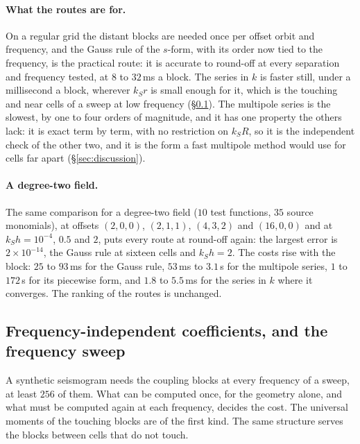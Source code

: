 \documentclass[11pt,a4paper]{article}
\begin{document}
\paragraph{What the routes are for.} On a regular grid the distant blocks are needed once per offset
orbit and frequency, and the Gauss rule of the $s$-form, with its order now tied to the frequency, is the
practical route: it is accurate to round-off at every separation and frequency tested, at $8$ to
$32$\,ms a block. The series in $k$ is faster still, under a millisecond a block, wherever $k_Sr$ is
small enough for it, which is the touching and near cells of a sweep at low frequency
(\S\ref{sec:sweep}). The multipole series is the slowest, by one to four orders of magnitude, and it has
one property the others lack: it is exact term by term, with no restriction on $k_SR$, so it is the
independent check of the other two, and it is the form a fast multipole method would use for cells far
apart (\S\ref{sec:discussion}).

\paragraph{A degree-two field.} The same comparison for a degree-two field ($10$ test functions, $35$
source monomials), at offsets $(2,0,0)$, $(2,1,1)$, $(4,3,2)$ and $(16,0,0)$ and at $k_Sh=10^{-4}$,
$0.5$ and $2$, puts every route at round-off again: the largest error is $2\times10^{-14}$, the Gauss
rule at sixteen cells and $k_Sh=2$. The costs rise with the block: $25$ to $93$\,ms for the Gauss rule,
$53$\,ms to $3.1$\,s for the multipole series, $1$ to $172$\,s for its piecewise form, and $1.8$ to
$5.5$\,ms for the series in $k$ where it converges. The ranking of the routes is unchanged.

\subsection{Frequency-independent coefficients, and the frequency sweep}\label{sec:sweep}

A synthetic seismogram needs the coupling blocks at every frequency of a sweep, at least $256$ of them.
What can be computed once, for the geometry alone, and what must be computed again at each frequency,
decides the cost. The universal moments of the touching blocks are of the first kind. The same structure
serves the blocks between cells that do not touch.
\end{document}
